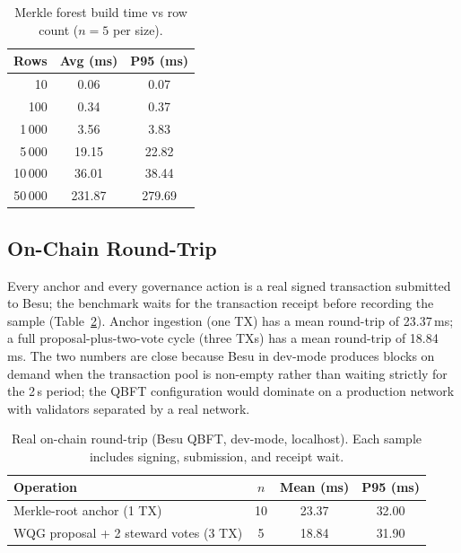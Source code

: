 \documentclass[10pt,twocolumn]{article}
\begin{document}
\begin{table}[t]
\centering
\small
\caption{Merkle forest build time vs row count ($n{=}5$ per size).}
\label{tab:merkle-scale}
\begin{tabular}{@{}rcc@{}}
\toprule
\textbf{Rows} & \textbf{Avg (ms)} & \textbf{P95 (ms)} \\
\midrule
10       & 0.06   & 0.07   \\
100      & 0.34   & 0.37   \\
1\,000   & 3.56   & 3.83   \\
5\,000   & 19.15  & 22.82  \\
10\,000  & 36.01  & 38.44  \\
50\,000  & 231.87 & 279.69 \\
\bottomrule
\end{tabular}
\end{table}

\subsection{On-Chain Round-Trip}

Every anchor and every governance action is a real signed
transaction submitted to Besu; the benchmark waits for the
transaction receipt before recording the sample
(Table~\ref{tab:onchain}). Anchor ingestion (one TX) has a mean
round-trip of 23.37\,ms; a full proposal-plus-two-vote cycle
(three TXs) has a mean round-trip of 18.84\,ms. The two numbers
are close because Besu in dev-mode produces blocks on demand when
the transaction pool is non-empty rather than waiting strictly for
the 2\,s period; the QBFT configuration would dominate on a
production network with validators separated by a real network.

\begin{table}[t]
\centering
\small
\caption{Real on-chain round-trip (Besu QBFT, dev-mode, localhost).
Each sample includes signing, submission, and receipt wait.}
\label{tab:onchain}
\begin{tabular}{@{}lccc@{}}
\toprule
\textbf{Operation} & \textbf{$n$} & \textbf{Mean (ms)}
  & \textbf{P95 (ms)} \\
\midrule
Merkle-root anchor (1 TX)            & 10 & 23.37 & 32.00 \\
WQG proposal + 2 steward votes (3 TX) & 5 & 18.84 & 31.90 \\
\bottomrule
\end{tabular}
\end{table}
\end{document}
